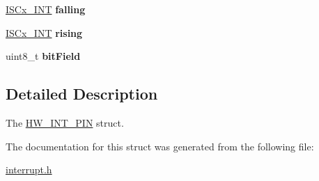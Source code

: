 \begin{DoxyCompactItemize}
$$\hyperlink{interrupt_8h_a7e03a41431c7de6b2b1af4cb96b7e2b2}{I\+S\+Cx\+\_\+\+I\+NT} {\bfseries falling}
\item 
\mbox{\label{structHW__INT__PIN_aa15c9ca17d61e91ec5ff071067b0e027}} 
\hyperlink{interrupt_8h_a7e03a41431c7de6b2b1af4cb96b7e2b2}{I\+S\+Cx\+\_\+\+I\+NT} {\bfseries rising}
\item 
\mbox{\label{structHW__INT__PIN_a5d1c0c3c1a4b58026c292c8d155ce35b}} 
uint8\+\_\+t {\bfseries bit\+Field}
\end{DoxyCompactItemize}


\subsection{Detailed Description}
The \hyperlink{structHW__INT__PIN}{H\+W\+\_\+\+I\+N\+T\+\_\+\+P\+IN} struct. 

The documentation for this struct was generated from the following file\+:\begin{DoxyCompactItemize}
\item 
\hyperlink{interrupt_8h}{interrupt.\+h}\end{DoxyCompactItemize}
